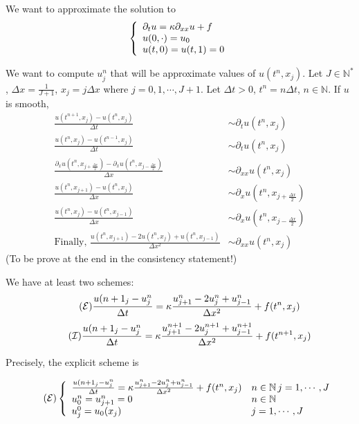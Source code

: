 \documentclass{report}
\newcommand{\N}{\ensuremath{\mathbb{N}}} %
\theoremstyle{plain}
\theoremstyle{definition}
\theoremstyle{remark}
\begin{document}
We want to approximate the solution to
\begin{equation}
	\left\lbrace
	\begin{array}[]{l}
		\partial_t u = \kappa \partial_{xx} u + f\\
		u(0,\cdot) = u_0 \\
		u(t,0) = u(t,1) = 0 
	\end{array}\right.
\end{equation}

We want to compute $u_j^n$ that will be approximate values of 
$u(t^n,x_j)$.
Let $J\in\N^*$, $\Delta x = \frac{1}{J+1}$,
$x_j = j\Delta x$ where $j=0,1,\cdots , J+1$.
Let $\Delta t > 0$, $t^n = n\Delta t$, $n\in\N$.
If $u$ is smooth,
\begin{align*}
	\frac{u(t^{n+1},x_j) - u(t^n,x_j)}{ \Delta t}
	&\sim \partial_t u(t^n,x_j)\\
	\frac{u(t^{n},x_j) - u(t^{n-1},x_j)}{ \Delta t}
	&\sim \partial_t u(t^n,x_j)\\
	\frac{\partial_x u(t^{n},x_{j+\frac{ \Delta x}{2}}) 
	-\partial_x u(t^{n},x_{j-\frac{ \Delta x}{2}})}{ \Delta x}
	&\sim \partial_{xx} u(t^n,x_j)\\
	\frac{u(t^{n},x_{j+1}) - u(t^{n},x_j)}{ \Delta x}
	&\sim \partial_x u(t^n,x_{j+\frac{ \Delta x}{2}})\\
	\frac{u(t^{n},x_{j}) - u(t^{n},x_{j-1})}{ \Delta x}
	&\sim \partial_x u(t^n,x_{j-\frac{ \Delta x}{2}})\\
	\text{Finally, }
	\frac{u(t^{n},x_{j+1}) -2u(t^{n},x_{j}) +u(t^{n},x_{j-1}) 
	}{ \Delta x^2}
	& \sim \partial_{xx} u(t^n,x_j)
\end{align*}
(To be prove at the end in the consistency statement!)

We have at least two schemes:
\begin{equation}
	\tag{$\mathcal{E}$}
	\frac{u({n+1}_j - u^n_j}{ \Delta t} = \kappa
	\frac{u^{n}_{j+1} -2u^{n}_{j} +u^{n}_{j-1}}{\Delta x^2}
	+f(t^n,x_j)
	\label{eq-diffusion-explicit}
\end{equation}
\begin{equation}
	\tag{$\mathcal{I}$}
	\frac{u({n+1}_j - u^n_j}{ \Delta t} = \kappa
	\frac{u^{n+1}_{j+1} -2u^{n+1}_{j} +u^{n+1}_{j-1}}{\Delta x^2}
	+f(t^{n+1},x_j)
	\label{eq-diffusion-implicit}
\end{equation}

Precisely, the explicit scheme is

\begin{equation}
	\tag{$\mathcal{E}$}
	\left\lbrace 
	\begin{array}[]{ll}
	\frac{u({n+1}_j - u^n_j}{ \Delta t} = \kappa
	\frac{u^{n}_{j+1} -2u^{n}_{j} +u^{n}_{j-1}}{\Delta x^2}
	+f(t^n,x_j)
	& n\in\N \, j=1,\cdots , J\\
	u^n_0 =u^n_{j+1} = 0 & n\in\N \\
	u^0_j = u_0(x_j) & j=1,\cdots , J
	\end{array}\right.
	\label{eq-diffusion-explicitP}
\end{equation}
\end{document}
